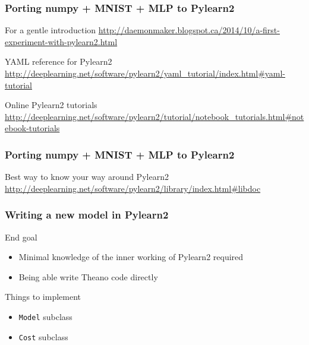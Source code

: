 \documentclass[mathserif, xcolor=dvipsnames]{beamer}
\begin{document}
\begin{frame}[fragile]
    \frametitle{Porting numpy + MNIST + MLP to Pylearn2}

    \begin{alertblock}{For a gentle introduction}
    \url{http://daemonmaker.blogspot.ca/2014/10/a-first-experiment-with-pylearn2.html}
    \end{alertblock}

    \begin{alertblock}{YAML reference for Pylearn2}
    \url{http://deeplearning.net/software/pylearn2/yaml_tutorial/index.html#yaml-tutorial}
    \end{alertblock}

    \begin{alertblock}{Online Pylearn2 tutorials}
    \url{http://deeplearning.net/software/pylearn2/tutorial/notebook_tutorials.html#notebook-tutorials}
    \end{alertblock}
\end{frame}

\begin{frame}[fragile]
    \frametitle{Porting numpy + MNIST + MLP to Pylearn2}

    \begin{alertblock}{Best way to know your way around Pylearn2}
    \url{http://deeplearning.net/software/pylearn2/library/index.html#libdoc}
    \end{alertblock}
\end{frame}

\begin{frame}[fragile]
    \frametitle{Writing a new model in Pylearn2}
    \begin{block}{End goal}
    \begin{itemize}
        \item{Minimal knowledge of the inner working of Pylearn2 required}
        \item{Being able write Theano code directly}
    \end{itemize}
    \end{block}

    \begin{block}{Things to implement}
    \begin{itemize}
        \item{\texttt{Model} subclass}
        \item{\texttt{Cost} subclass}
    \end{itemize}
    \end{block}

\end{frame}
\end{document}
